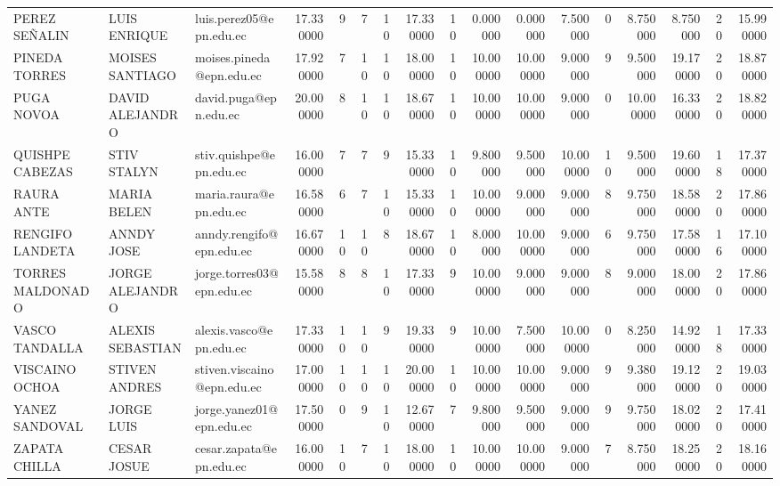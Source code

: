 \begin{tabular}{lllrrrrrrrrrrrrrr}
PEREZ SEÑALIN & LUIS ENRIQUE & luis.perez05@epn.edu.ec & 17.330000 & 9 & 7 & 10 & 17.330000 & 10 & 0.000000 & 0.000000 & 7.500000 & 0 & 8.750000 & 8.750000 & 20 & 15.990000 \\
PINEDA TORRES & MOISES SANTIAGO & moises.pineda@epn.edu.ec & 17.920000 & 7 & 10 & 10 & 18.000000 & 10 & 10.000000 & 10.000000 & 9.000000 & 9 & 9.500000 & 19.170000 & 20 & 18.870000 \\
PUGA NOVOA & DAVID ALEJANDRO & david.puga@epn.edu.ec & 20.000000 & 8 & 10 & 10 & 18.670000 & 10 & 10.000000 & 10.000000 & 9.000000 & 0 & 10.000000 & 16.330000 & 20 & 18.820000 \\
QUISHPE CABEZAS & STIV STALYN & stiv.quishpe@epn.edu.ec & 16.000000 & 7 & 7 & 9 & 15.330000 & 10 & 9.800000 & 9.500000 & 10.000000 & 10 & 9.500000 & 19.600000 & 18 & 17.370000 \\
RAURA ANTE & MARIA BELEN & maria.raura@epn.edu.ec & 16.580000 & 6 & 7 & 10 & 15.330000 & 10 & 10.000000 & 9.000000 & 9.000000 & 8 & 9.750000 & 18.580000 & 20 & 17.860000 \\
RENGIFO LANDETA & ANNDY JOSE & anndy.rengifo@epn.edu.ec & 16.670000 & 10 & 10 & 8 & 18.670000 & 10 & 8.000000 & 10.000000 & 9.000000 & 6 & 9.750000 & 17.580000 & 16 & 17.100000 \\
TORRES MALDONADO & JORGE ALEJANDRO & jorge.torres03@epn.edu.ec & 15.580000 & 8 & 8 & 10 & 17.330000 & 9 & 10.000000 & 9.000000 & 9.000000 & 8 & 9.000000 & 18.000000 & 20 & 17.860000 \\
VASCO TANDALLA & ALEXIS SEBASTIAN & alexis.vasco@epn.edu.ec & 17.330000 & 10 & 10 & 9 & 19.330000 & 9 & 10.000000 & 7.500000 & 10.000000 & 0 & 8.250000 & 14.920000 & 18 & 17.330000 \\
VISCAINO OCHOA & STIVEN ANDRES & stiven.viscaino@epn.edu.ec & 17.000000 & 10 & 10 & 10 & 20.000000 & 10 & 10.000000 & 10.000000 & 9.000000 & 9 & 9.380000 & 19.120000 & 20 & 19.030000 \\
YANEZ SANDOVAL & JORGE LUIS & jorge.yanez01@epn.edu.ec & 17.500000 & 0 & 9 & 10 & 12.670000 & 7 & 9.800000 & 9.500000 & 9.000000 & 9 & 9.750000 & 18.020000 & 20 & 17.410000 \\
ZAPATA CHILLA & CESAR JOSUE & cesar.zapata@epn.edu.ec & 16.000000 & 10 & 7 & 10 & 18.000000 & 10 & 10.000000 & 10.000000 & 9.000000 & 7 & 8.750000 & 18.250000 & 20 & 18.160000 \\
\bottomrule
\end{tabular}
